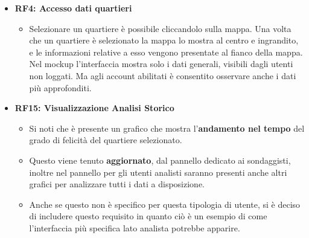     \begin{itemize}
        \item \textbf{RF4: Accesso dati quartieri} \begin{itemize}
            \item Selezionare un quartiere è possibile cliccandolo sulla mappa. Una volta che un quartiere è selezionato la mappa lo mostra al centro e ingrandito, e le informazioni relative a esso vengono presentate al fianco della mappa. Nel mockup l'interfaccia mostra solo i dati generali, visibili dagli utenti non loggati. Ma agli account abilitati è consentito osservare anche i dati più approfonditi.
        \end{itemize} 
        \item \textbf{RF15: Visualizzazione Analisi Storico} \begin{itemize}
            \item Si noti che è presente un grafico che mostra l'\textbf{andamento nel tempo} del grado di felicità del quartiere selezionato. 
            \item Questo viene tenuto \textbf{aggiornato}, dal pannello dedicato ai sondaggisti, inoltre nel pannello per gli utenti analisti saranno presenti anche altri grafici per analizzare tutti i dati a disposizione.
            \item Anche se questo non è specifico per questa tipologia di utente, si è deciso di includere questo requisito in quanto ciò è un esempio di come l'interfaccia più specifica lato analista potrebbe apparire.
        \end{itemize}
    \end{itemize}
